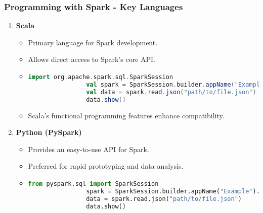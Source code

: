 \documentclass[aspectratio=169]{beamer}
\begin{document}
\begin{frame}[fragile]
    \frametitle{Programming with Spark - Key Languages}
    \begin{enumerate}
        \item \textbf{Scala}
            \begin{itemize}
                \item Primary language for Spark development.
                \item Allows direct access to Spark's core API.
                \item \begin{lstlisting}[language=scala]
                import org.apache.spark.sql.SparkSession
                val spark = SparkSession.builder.appName("Example").getOrCreate()
                val data = spark.read.json("path/to/file.json")
                data.show()
                \end{lstlisting}
                \item Scala's functional programming features enhance compatibility.
            \end{itemize}
        \item \textbf{Python (PySpark)}
            \begin{itemize}
                \item Provides an easy-to-use API for Spark.
                \item Preferred for rapid prototyping and data analysis.
                \item \begin{lstlisting}[language=python]
                from pyspark.sql import SparkSession
                spark = SparkSession.builder.appName("Example").getOrCreate()
                data = spark.read.json("path/to/file.json")
                data.show()
                \end{lstlisting}
            \end{itemize}
    \end{enumerate}
\end{frame}
\end{document}
